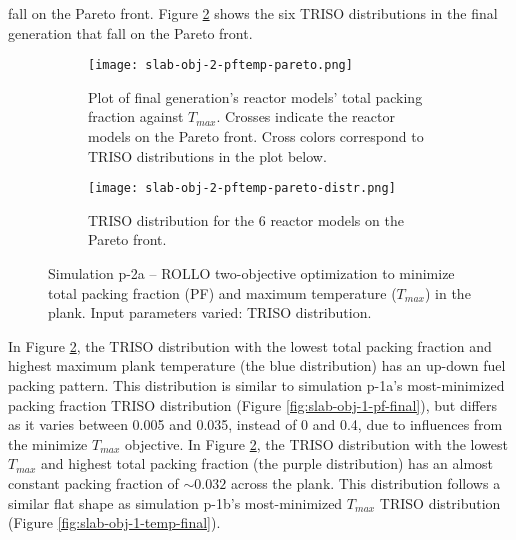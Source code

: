 fall on the Pareto front.
Figure \ref{fig:slab-obj-2-pftemp-pareto-distr} shows the six TRISO distributions in 
the final generation that fall on the Pareto front. 
\begin{figure}[htbp!]
    \centering
    \begin{subfigure}{\textwidth}
        \texttt{[image: slab-obj-2-pftemp-pareto.png]}
        \caption{Plot of final generation's reactor models' total packing fraction against 
        $T_{max}$. Crosses indicate the reactor models on the Pareto front. Cross colors correspond  
        to TRISO distributions in the plot below.}
        \label{fig:slab-obj-2-pftemp-pareto} 
    \end{subfigure}
    \begin{subfigure}{\textwidth}
        \texttt{[image: slab-obj-2-pftemp-pareto-distr.png]}
        \caption{TRISO distribution for the 6 reactor models on the Pareto front.}
        \label{fig:slab-obj-2-pftemp-pareto-distr} 
    \end{subfigure}
    \caption{Simulation p-2a -- ROLLO two-objective optimization to minimize total packing fraction (PF) and  
    maximum temperature ($T_{max}$) in the plank. Input parameters varied: 
    TRISO distribution.}
    \label{fig:slab-obj-2-pftemp}
\end{figure}
In Figure \ref{fig:slab-obj-2-pftemp-pareto-distr}, the TRISO distribution with the lowest 
total packing fraction and highest maximum plank temperature (the blue distribution) has 
an up-down fuel packing pattern. 
This distribution is similar to simulation p-1a's most-minimized packing fraction TRISO 
distribution (Figure \ref{fig:slab-obj-1-pf-final}), but differs as it varies between 
0.005 and 0.035, instead of 0 and 0.4, due to influences from the minimize $T_{max}$ 
objective. 
In Figure \ref{fig:slab-obj-2-pftemp-pareto-distr}, the TRISO distribution with the 
lowest $T_{max}$ and highest total packing fraction (the purple distribution)
has an almost constant packing fraction of $\sim0.032$ across the plank. 
This distribution follows a similar flat shape as simulation p-1b's most-minimized 
$T_{max}$ TRISO distribution (Figure \ref{fig:slab-obj-1-temp-final}).

